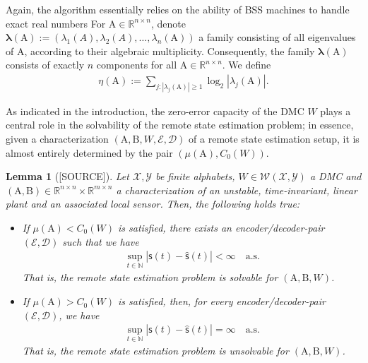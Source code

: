 \documentclass[conference]{IEEEtran}
\newcommand{\rs}{\mathsf{s}}
\def\E{{\mathcal E}}
\def\D{{\mathcal D}}
\def\X{{\mathcal X}}
\def\Y{{\mathcal Y}}
\def\W{{\mathcal W}}
\def\NN{{\mathbb N}}
\def\RR{{\mathbb R}}
\def\mA{\bm{\mathrm{A}}}
\def\mB{\bm{\mathrm{B}}}
\newcommand{\sdummy}{{\color{red}[SOURCE]}}
\newtheorem{Lemma}[Theorem]{Lemma}
\begin{document}
	Again, the algorithm essentially relies on the ability of BSS machines to handle exact real numbers 
	For \(\mA \in \RR^{n\times n}\), denote \(\bm{\lambda}(\mA) := (\lambda_1(A),\lambda_2(A),\ldots,\lambda_n(\mA))\) a family 
	consisting of all eigenvalues of \(\mA\), according to their algebraic multiplicity. Consequently, the family \(\bm{\lambda}(\mA)\)
	consists of exactly \(n\) components for all \(\mA\in \RR^{n\times n}\). We define
	\begin{align}	\eta(\mA):=\sum_{j:|\lambda_j(\mA)|\geq 1} \log_2|\lambda_j(\mA)|.
	\end{align}
	
	As indicated in the introduction, the zero-error capacity of the DMC \(W\) plays a central role in the solvability of the remote state estimation problem;
	in essence, given a characterization \((\mA,\mB,W,\E,\D)\) of a remote state estimation setup, it is almost entirely determined by the pair \((\mu(\mA),C_0(W))\).
	
	\begin{Lemma} 	[\sdummy]\label{lem:SolvabilityCondition} Let \(\X,\Y\) be finite alphabets, \(W\in \W(\X,\Y)\) a DMC and \((\mA,\mB) \in \RR^{n\times n}\times \RR^{m\times n}\) 
					a characterization of an unstable, time-invariant, linear plant and an associated local sensor. Then, the following holds true:
					\begin{itemize}	\item If \(\mu(\mA) < C_0(W)\) is satisfied, there exists an encoder/decoder-pair \((\E,\D)\) such that we have
										\begin{align*}
											\sup_{t\in\NN} |\rs(t) - \hat{\rs}(t)| < \infty \quad \text{a.s.}
										\end{align*}
										That is, the remote state estimation problem is \emph{solvable} for \((\mA,\mB, W)\).
									\item If \(\mu(\mA) > C_0(W)\) is satisfied, then, for every encoder/decoder-pair \((\E,\D)\), we have 
										\begin{align*}
											\sup_{t\in\NN} |\rs(t) - \hat{\rs}(t)| = \infty \quad \text{a.s.}
										\end{align*}
										That is, the remote state estimation problem is \emph{unsolvable} for \((\mA,\mB, W)\).
					\end{itemize}
	\end{Lemma} 
	
\end{document}
